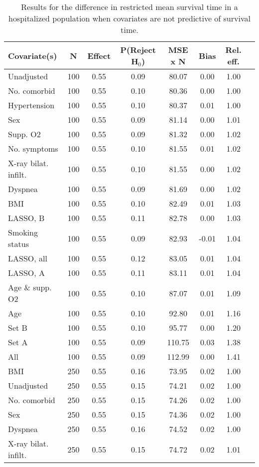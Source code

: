 \documentclass{article}
\begin{document}
{\tabcolsep=6pt  %
\begin{longtable}{lccccccc}
\caption{Results for the difference in restricted mean survival time in a hospitalized population when covariates are not predictive of survival time.}\label{tab8}\\
Covariate(s) & N & Effect & P(Reject H$_0$) & MSE x N & Bias & Rel. eff.\\ \midrule
Unadjusted & 100 & 0.55 & 0.09 & 80.07 & 0.00 & 1.00\\
No. comorbid & 100 & 0.55 & 0.10 & 80.36 & 0.00 & 1.00\\
Hypertension & 100 & 0.55 & 0.10 & 80.37 & 0.01 & 1.00\\
Sex & 100 & 0.55 & 0.09 & 81.14 & 0.00 & 1.01\\
Supp. O2 & 100 & 0.55 & 0.09 & 81.32 & 0.00 & 1.02\\
No. symptoms & 100 & 0.55 & 0.10 & 81.55 & 0.01 & 1.02\\
X-ray bilat. infilt. & 100 & 0.55 & 0.10 & 81.55 & 0.00 & 1.02\\
Dyspnea & 100 & 0.55 & 0.09 & 81.69 & 0.00 & 1.02\\
BMI & 100 & 0.55 & 0.10 & 82.49 & 0.01 & 1.03\\
LASSO, B & 100 & 0.55 & 0.11 & 82.78 & 0.00 & 1.03\\
Smoking status & 100 & 0.55 & 0.09 & 82.93 & -0.01 & 1.04\\
LASSO, all & 100 & 0.55 & 0.12 & 83.05 & 0.01 & 1.04\\
LASSO, A & 100 & 0.55 & 0.11 & 83.11 & 0.01 & 1.04\\
Age \& supp. O2 & 100 & 0.55 & 0.10 & 87.07 & 0.01 & 1.09\\
Age & 100 & 0.55 & 0.10 & 92.80 & 0.01 & 1.16\\
Set B & 100 & 0.55 & 0.10 & 95.77 & 0.00 & 1.20\\
Set A & 100 & 0.55 & 0.09 & 110.75 & 0.03 & 1.38\\
All & 100 & 0.55 & 0.09 & 112.99 & 0.00 & 1.41\\ \midrule
BMI & 250 & 0.55 & 0.16 & 73.95 & 0.02 & 1.00\\
Unadjusted & 250 & 0.55 & 0.15 & 74.21 & 0.02 & 1.00\\
No. comorbid & 250 & 0.55 & 0.15 & 74.26 & 0.02 & 1.00\\
Sex & 250 & 0.55 & 0.15 & 74.36 & 0.02 & 1.00\\
Dyspnea & 250 & 0.55 & 0.16 & 74.52 & 0.02 & 1.00\\
X-ray bilat. infilt. & 250 & 0.55 & 0.15 & 74.72 & 0.02 & 1.01\\

\end{longtable}}
\end{document}
